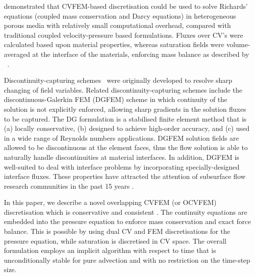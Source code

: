 \documentclass[preprint,authoryear,12pt]{elsarticle}
\begin{document}
\citet{cumming_2011} demonstrated that CVFEM-based discretisation could be used to solve Richards' equations (coupled mass conservation and Darcy equations) in heterogeneous porous media with relatively small computational overhead, compared with traditional coupled velocity-pressure based formulations. Fluxes over CV's were calculated based upon material properties, whereas saturation fields were volume-averaged at the interface of the materials, enforcing mass balance as described by \citet{kirkland_1992}~\citep[see also][]{forsyth_1990,cumming_phd2012}.

\medskip

Discontinuity-capturing schemes~\citep[e.g., shock waves, contact surface or material discontinuity -- see][]{brooks_1982,tezduyar_1986} were originally developed to resolve sharp changing of field variables. Related discontinuity-capturing schemes include the discontinuous-Galerkin FEM (DGFEM) scheme in which continuity of the solution is not explicitly enforced, allowing sharp gradients in the solution fluxes to be captured. The DG formulation is a stabilised finite element method that is (a) locally conservative, (b) designed to achieve high-order accuracy, and (c) used in a wide range of Reynolds numbers applications. DGFEM solution fields are allowed to be discontinuous at the element faces, thus the flow solution is able to naturally handle discontinuities at material interfaces. In addition, DGFEM is well-suited to deal with interface problems by incorporating specially-designed interface fluxes. These properties have attracted the attention of subsurface flow research communities in the past 15 years \citep[see][]{riviere_2000,riviere_2002,bastian_2002}.

\medskip 

In this paper, we describe a novel overlapping CVFEM (or OCVFEM) discretisation which is conservative and consistent \citep{jackson_2013}. The continuity equations are embedded into the pressure equation to enforce mass conservation and exact force balance. This is possible by using dual CV and FEM discretisations for the pressure equation, while saturation is discretised in CV space. The overall formulation employs an implicit algorithm with respect to time that is unconditionally stable for pure advection and with no restriction on the time-step size.
\end{document}
